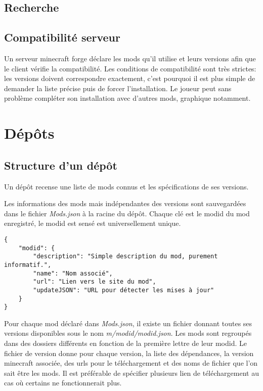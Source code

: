 \documentclass{article}
\begin{document}
\subsection{Recherche}

\subsection{Compatibilité serveur}
Un serveur minecraft forge déclare les mods qu'il utilise et leurs versions afin que le client vérifie la compatibilité.
Les conditions de compatibilité sont très strictes: les versions doivent correspondre exactement, c'est pourquoi il est plus simple de demander la liste précise puis de forcer l'installation.
Le joueur peut sans problème compléter son installation avec d'autres mods, graphique notamment.


%
%
\section{Dépôts}
\label{section:depot}
\subsection{Structure d'un dépôt}
Un dépôt recense une liste de mods connus et les spécifications de ses versions.

Les informations des mods mais indépendantes des versions sont sauvegardées dans le fichier \textit{Mods.json} à la racine du dépôt.
Chaque clé est le modid du mod enregistré, le modid est sensé est universellement unique.

\begin{verbatim}
{
    "modid": {
        "description": "Simple description du mod, purement informatif.",
        "name": "Nom associé",
        "url": "Lien vers le site du mod",
        "updateJSON": "URL pour détecter les mises à jour"
    }
}
\end{verbatim}

Pour chaque mod déclaré dans \textit{Mods.json}, il existe un fichier donnant toutes ses versions disponibles sous le nom \textit{m/modid/modid.json}.
Les mods sont regroupés dans des dossiers différents en fonction de la première lettre de leur modid.
Le fichier de version donne pour chaque version, la liste des dépendances, la version minecraft associée, des urls pour le téléchargement et des noms de fichier que l'on sait être les mods.
Il est préférable de spécifier plusieurs lien de téléchargement au cas où certains ne fonctionnerait plus.
\end{document}
